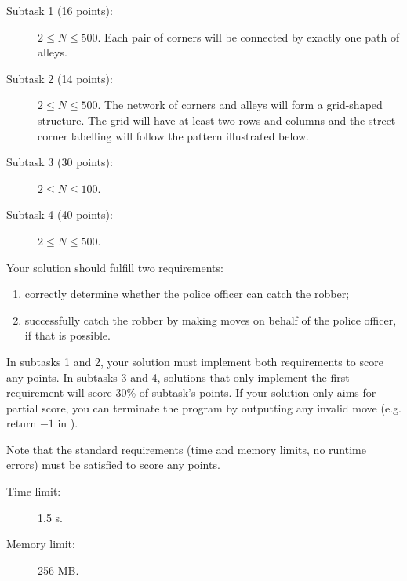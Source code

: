 \documentclass{boi2014}
\begin{document}
    \Scoring
    
    \begin{description}
        \item[Subtask 1 (16 points):] $2 \le N \le 500$.
        Each pair of corners will be connected by exactly one path of alleys.
        \item[Subtask 2 (14 points):] $2 \le N \le 500$. The network of corners
        and alleys will form a grid-shaped structure. The grid will have at
        least two rows and columns and the street corner labelling will follow
        the pattern illustrated below.
        \begin{figure}[h!]
           \centering
        \end{figure}
        \item[Subtask 3 (30 points):] $2 \le N \le 100$.
        \item[Subtask 4 (40 points):] $2 \le N \le 500$.
    \end{description}
    
    Your solution should fulfill two requirements:
    \begin{enumerate}
    	\item correctly determine whether the police officer can catch
    		the robber;
	\item successfully catch the robber by making moves on behalf
		of the police officer, if that is possible.
    \end{enumerate}
    
    In subtasks 1 and 2, your solution must implement both requirements to score any points.
    In subtasks 3 and 4, solutions that only implement the
    first requirement will score 30\% of subtask's points.
    If your solution only aims for partial score, you can terminate
    the program by outputting any invalid move (e.g. return $-1$ in ).

	Note that the standard requirements (time and memory limits, no runtime errors)
	must be satisfied to score any points.
    
    \Constraints
    
    \begin{description}
        \item[Time limit:] 1.5 s.
        \item[Memory limit:] 256 MB.
    \end{description}
\end{document}
